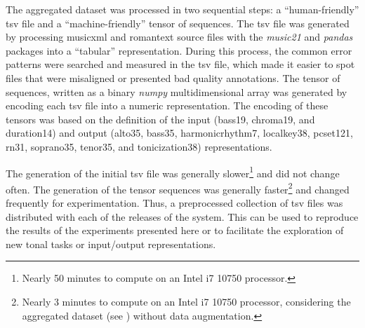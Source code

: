
The aggregated dataset was processed in two sequential
steps: a ``human-friendly'' \gls{tsv} file and a
``machine-friendly'' tensor of sequences. The \gls{tsv} file
was generated by processing \gls{musicxml} and
\gls{romantext} source files with the \emph{music21}
\parencite{cuthbert2010music21} and \emph{pandas}
\parencite{mckinney2011pandas} packages into a ``tabular''
representation. During this process, the common error
patterns were searched and measured in the \gls{tsv} file,
which made it easier to spot files that were misaligned or
presented bad quality annotations. The tensor of sequences,
written as a binary \emph{numpy}
\parencite{oliphant2006guide} multidimensional array was
generated by encoding each \gls{tsv} file into a numeric
representation. The encoding of these tensors was based on
the definition of the input (\gls{bass19}, \gls{chroma19},
and \gls{duration14}) and output (\gls{alto35},
\gls{bass35}, \gls{harmonicrhythm7}, \gls{localkey38},
\gls{pcset121}, \gls{rn31}, \gls{soprano35}, \gls{tenor35},
and \gls{tonicization38}) representations.

The generation of the initial \gls{tsv} file was generally
slower\footnote{Nearly 50 minutes to compute on an Intel i7
10750 processor.} and did not change often. The generation
of the tensor sequences was generally faster\footnote{Nearly
3 minutes to compute on an Intel i7 10750 processor,
considering the aggregated dataset (see
) without data augmentation.}
and changed frequently for experimentation. Thus, a
preprocessed collection of \gls{tsv} files was distributed
with each of the releases of the system. This can be used to
reproduce the results of the experiments presented here or
to facilitate the exploration of new tonal tasks or
input/output representations.
